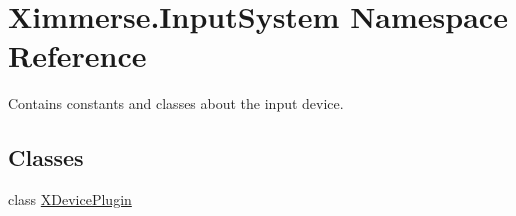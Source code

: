 \hypertarget{namespace_ximmerse_1_1_input_system}{}\section{Ximmerse.\+Input\+System Namespace Reference}
\label{namespace_ximmerse_1_1_input_system}


Contains constants and classes about the input device.  


\subsection*{Classes}
\begin{DoxyCompactItemize}
\item 
class \mbox{\hyperlink{class_ximmerse_1_1_input_system_1_1_x_device_plugin}{X\+Device\+Plugin}}
\end{DoxyCompactItemize}
